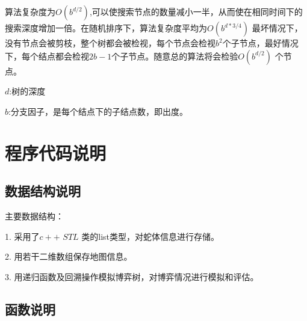 \documentclass{ctexrep}
\begin{document}
算法复杂度为$O\left(b^{d / 2}\right)$,可以使搜索节点的数量减小一半，从而使在相同时间下的搜索深度增加一倍。在随机排序下，算法复杂度平均为$O\left(b^{d *3/4}\right)$
最坏情况下，没有节点会被剪枝，整个树都会被检视，每个节点会检视$b^2$个子节点，最好情况下，每个结点都会检视$2b-1$个子节点。随意总的算法将会检验$O\left(b^{d / 2}\right)$ 个节点。

$d$:树的深度 

$b$:分支因子，是每个结点下的子结点数，即出度。

\chapter{程序代码说明}


\section{数据结构说明}
\vspace{1cm}
主要数据结构：
\vspace{0.4cm}

1. 采用了$c++$ $STL$ 类的list类型，对蛇体信息进行存储。
\vspace{0.4cm}

2. 用若干二维数组保存地图信息。
\vspace{0.4cm}

3. 用递归函数及回溯操作模拟博弈树，对博弈情况进行模拟和评估。

\section{函数说明}
\end{document}
